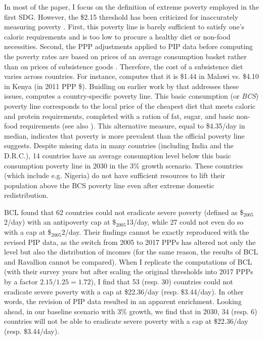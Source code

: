 In most of the paper, I focus on the definition of extreme poverty employed in the first SDG. However, the \$2.15 threshold has been criticized for inaccurately measuring poverty \citep{woodward_redefining_2010,deaton_price_2010,deaton_purchasing_2011}. %
First, this poverty line %
is barely sufficient to satisfy one's caloric requirements and is too low to procure a healthy diet or non-food necessities. 
Second, the PPP adjustments applied to PIP data before computing the poverty rates are based on prices of an average consumption basket rather than on prices of subsistence goods \citep{sullivan_capitalist_2023}. Therefore, the cost of a subsistence diet varies across countries. For instance, \cite{moatsos_global_2016} computes that it is \$1.44 in Malawi vs. \$4.10 in Kenya (in 2011 PPP \$). Buidling on earlier work by \cite{allen_absolute_2017} that addresses these issues, \cite{moatsos_global_2016} computes a country-specific poverty line. This basic consumption (or \textit{BCS}) poverty line corresponds to the local price of the cheapest diet that meets caloric and protein requirements, completed with a ration of fat, sugar, and basic non-food requirements (see also \citealp{moatsos_global_2021}). This alternative measure, equal to \$4.35/day in median, indicates that poverty %
is more prevalent than the official poverty line suggests. Despite missing data in many countries (including India and the D.R.C.), 14 countries have an average consumption level below this basic consumption poverty line in 2030 in the 3\% growth scenario. These countries (which include e.g. Nigeria) do not have sufficient resources to lift their population above the BCS poverty line even after extreme domestic redistribution. 

BCL found that 62 countries could not eradicate severe poverty (defined as \$$_\text{2005}$2/day) with an antipoverty cap at \$$_\text{2005}$13/day, while 27 could not even do so with a cap at \$$_\text{2005}$2/day. 
Their findings cannot be exactly reproduced with the revised PIP data, as the switch from 2005 to 2017 PPPs has altered not only the level but also the distribution of incomes (for the same reason, the results of BCL and Ravallion cannot be compared). 
When I replicate the computations of BCL (with their survey years but after scaling the original thresholds into 2017 PPPs by a factor $2.15/1.25 = 1.72$), I find that 53 (resp. 30) 
countries could not eradicate severe poverty with a cap at \$22.36/day (resp. \$3.44/day). 
In other words, the revision of PIP data resulted in an apparent enrichment. 
Looking ahead, in our baseline scenario with 3\% growth, we find that in 2030, 34 (resp. 6) 
countries will not be able to eradicate severe poverty with a cap at \$22.36/day (resp. \$3.44/day).

